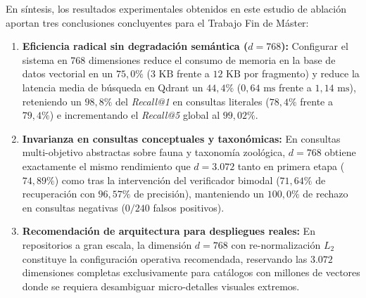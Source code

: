 En síntesis, los resultados experimentales obtenidos en este estudio de ablación aportan tres conclusiones concluyentes para el Trabajo Fin de Máster:
\begin{enumerate}
    \item \textbf{Eficiencia radical sin degradación semántica ($d = 768$):} Configurar el sistema en 768 dimensiones reduce el consumo de memoria en la base de datos vectorial en un \textbf{$75,0\%$} ($3\text{ KB}$ frente a $12\text{ KB}$ por fragmento) y reduce la latencia media de búsqueda en Qdrant un \textbf{$44,4\%$} ($0,64\text{ ms}$ frente a $1,14\text{ ms}$), reteniendo un \textbf{$98,8\%$} del \textit{Recall@1} en consultas literales ($78,4\%$ frente a $79,4\%$) e incrementando el \textit{Recall@5} global al \textbf{$99,02\%$}.
    \item \textbf{Invarianza en consultas conceptuales y taxonómicas:} En consultas multi-objetivo abstractas sobre fauna y taxonomía zoológica, $d = 768$ obtiene exactamente el mismo rendimiento que $d = 3.072$ tanto en primera etapa ($74,89\%$) como tras la intervención del verificador bimodal ($71,64\%$ de recuperación con $96,57\%$ de precisión), manteniendo un $100,0\%$ de rechazo en consultas negativas ($0/240$ falsos positivos).
    \item \textbf{Recomendación de arquitectura para despliegues reales:} En repositorios a gran escala, la dimensión $d = 768$ con re-normalización $L_2$ constituye la configuración operativa recomendada, reservando las $3.072$ dimensiones completas exclusivamente para catálogos con millones de vectores donde se requiera desambiguar micro-detalles visuales extremos.
\end{enumerate}
